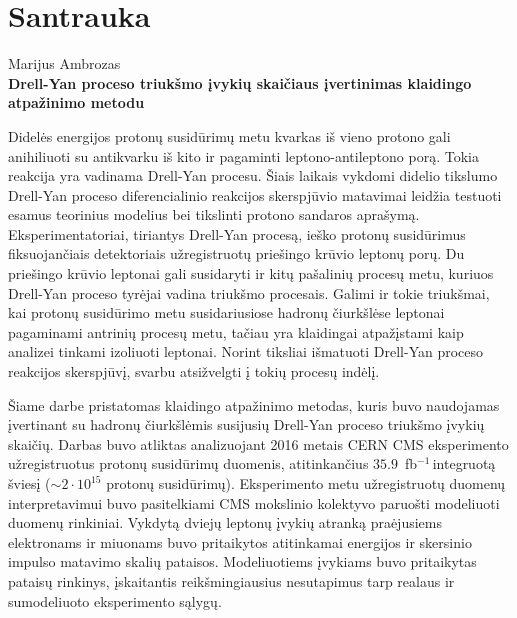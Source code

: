 \documentclass[a4paper, 12pt, oneside]{article}
\newcommand{\invfb}{fb$^{-1}\,$}
\begin{document}
\newpage
{}




\newpage
\section*{Santrauka}
\begin{centering}
Marijus Ambrozas\\
\textbf{Drell-Yan proceso triukšmo įvykių skaičiaus įvertinimas klaidingo atpažinimo metodu}\\
\end{centering}
\vspace{0.5cm}

Didelės energijos protonų susidūrimų metu kvarkas iš vieno protono gali anihiliuoti su antikvarku iš kito ir pagaminti
leptono-antileptono porą.
Tokia reakcija yra vadinama Drell-Yan procesu.
Šiais laikais vykdomi didelio tikslumo Drell-Yan proceso diferencialinio reakcijos skerspjūvio matavimai leidžia
testuoti esamus teorinius modelius bei tikslinti protono sandaros aprašymą.
Eksperimentatoriai, tiriantys Drell-Yan procesą, ieško protonų susidūrimus fiksuojančiais detektoriais užregistruotų
priešingo krūvio leptonų porų.
Du priešingo krūvio leptonai gali susidaryti ir kitų pašalinių procesų metu, kuriuos Drell-Yan proceso tyrėjai vadina
triukšmo procesais.
Galimi ir tokie triukšmai, kai protonų susidūrimo metu susidariusiose hadronų čiurkšlėse leptonai pagaminami antrinių procesų
metu, tačiau yra klaidingai atpažįstami kaip analizei tinkami izoliuoti leptonai.
Norint tiksliai išmatuoti Drell-Yan proceso reakcijos skerspjūvį, svarbu atsižvelgti į tokių procesų indėlį.

Šiame darbe pristatomas klaidingo atpažinimo metodas, kuris buvo naudojamas įvertinant su hadronų čiurkšlėmis susijusių
Drell-Yan proceso triukšmo įvykių skaičių.
Darbas buvo atliktas analizuojant 2016 metais CERN CMS eksperimento užregistruotus protonų susidūrimų duomenis,
atitinkančius $35.9$~\invfb integruotą šviesį ($\sim\!2 \cdot 10^{15}$ protonų susidūrimų).
Eksperimento metu užregistruotų duomenų interpretavimui buvo pasitelkiami CMS mokslinio kolektyvo paruošti
modeliuoti duomenų rinkiniai.
Vykdytą dviejų leptonų įvykių atranką praėjusiems elektronams ir miuonams buvo pritaikytos atitinkamai energijos ir
skersinio impulso matavimo skalių pataisos.
Modeliuotiems įvykiams buvo pritaikytas pataisų rinkinys, įskaitantis reikšmingiausius nesutapimus tarp realaus ir sumodeliuoto
eksperimento sąlygų.
\end{document}
